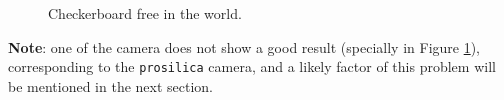 \begin{figure}[!htbp]
 \centering
 \caption{Checkerboard free in the world.}
 \label{fig:cal_free}
\end{figure}

\noindent
\textbf{Note}: one of the camera does not show a good result (specially in Figure \ref{fig:cal_free}), corresponding to the \texttt{prosilica} camera, and a likely factor of this problem will be mentioned in the next section.


